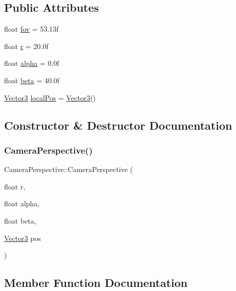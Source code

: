 \subsection*{Public Attributes}
\begin{DoxyCompactItemize}
\item 
float \hyperlink{class_camera_perspective_a53ed75a72568390a0a42c217baf07221}{fov} = 53.\+13f
\item 
float \hyperlink{class_camera_perspective_adb49aa14a62f537f810038351b141a36}{r} = 20.\+0f
\item 
float \hyperlink{class_camera_perspective_a93009a48069d0d671317c5d9f7d66963}{alpha} = 0.\+0f
\item 
float \hyperlink{class_camera_perspective_a3545402762e444abd3cb90ea9d2e72ca}{beta} = 40.\+0f
\item 
\hyperlink{class_vector3}{Vector3} \hyperlink{class_camera_perspective_afe2ca37c029acb558350b2fe1025e9c5}{local\+Pos} = \hyperlink{class_vector3}{Vector3}()
\end{DoxyCompactItemize}


\subsection{Constructor \& Destructor Documentation}
\mbox{\label{class_camera_perspective_a44735f45c240e39cd10dcae59dc752d3}} 
\subsubsection{\texorpdfstring{Camera\+Perspective()}{CameraPerspective()}}
{\footnotesize\ttfamily Camera\+Perspective\+::\+Camera\+Perspective (\begin{DoxyParamCaption}\item[{float}]{r,  }\item[{float}]{alpha,  }\item[{float}]{beta,  }\item[{\hyperlink{class_vector3}{Vector3}}]{pos }\end{DoxyParamCaption})\hspace{0.3cm}{\ttfamily [inline]}}



\subsection{Member Function Documentation}
\mbox{\label{class_camera_perspective_aaaa30cbae530a2d4716a3f333df2d240}} 
